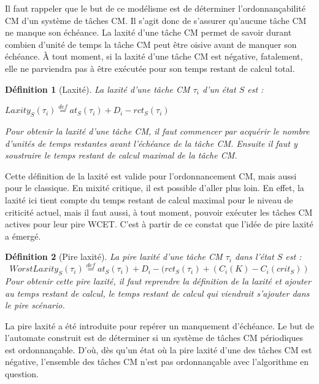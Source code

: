\documentclass[12pt,a4paper,oneside]{book}
\theoremstyle{break}
\newtheorem{defin}{Définition}[chapter]
\theoremstyle{breakplain}
\begin{document}
Il faut rappeler que le but de ce modélisme est de déterminer l'ordonnançabilité CM d'un système de tâches CM. Il s'agit donc de s'assurer qu'aucune tâche CM ne manque son échéance. La laxité d'une tâche CM permet de savoir durant combien d'unité de temps la tâche CM peut être oisive avant de manquer son échéance. À tout moment, si la laxité d'une tâche CM est négative, fatalement,  elle ne parviendra pas à être exécutée pour son temps restant de calcul total.\\

\begin{defin}[Laxité]
La laxité d'une tâche CM $\tau_i$ d'un état $S$ est :

\begin{center}
$Laxity_S(\tau_i) \overset{def}{=} at_S(\tau_i)  + D_i - rct_S(\tau_i)$\\
\end{center}

Pour obtenir la laxité d'une tâche CM, il faut commencer par acquérir le nombre d'unités de temps restantes avant l'échéance de la tâche CM. Ensuite il faut y soustraire le temps restant de calcul maximal de la tâche CM.\\
\end{defin}

Cette définition de la laxité est valide pour l'ordonnancement CM, mais aussi pour le classique. En mixité critique, il est possible d'aller plus loin. En effet, la laxité ici tient compte du temps restant de calcul maximal pour le niveau de criticité actuel, mais il faut aussi, à tout moment, pouvoir exécuter les tâches CM actives pour leur pire WCET. C'est à partir de ce constat que l'idée de pire laxité a émergé.\\

\begin{defin}[Pire laxité]
\label{per:worstlaxity}
La pire laxité d'une tâche CM $\tau_i$ dans l'état $S$ est :
$$
WorstLaxity_S(\tau_i) \overset{def}{=} at_S(\tau_i) + D_i - (rct_S(\tau_i) + (C_i(K)-C_i(crit_S))
$$
Pour obtenir cette pire laxité, il faut reprendre la définition de la laxité et ajouter au temps restant de calcul, le temps restant de calcul qui viendrait s'ajouter dans le pire scénario.
\end{defin}

La pire laxité a été introduite pour repérer un manquement d'échéance. Le but de l'automate construit est de déterminer si un système de tâches CM périodiques est ordonnançable. D'où, dès qu'un état où la pire laxité d'une des tâches CM est négative, l'ensemble des tâches CM n'est pas ordonnançable avec l'algorithme en question.\\
\end{document}
